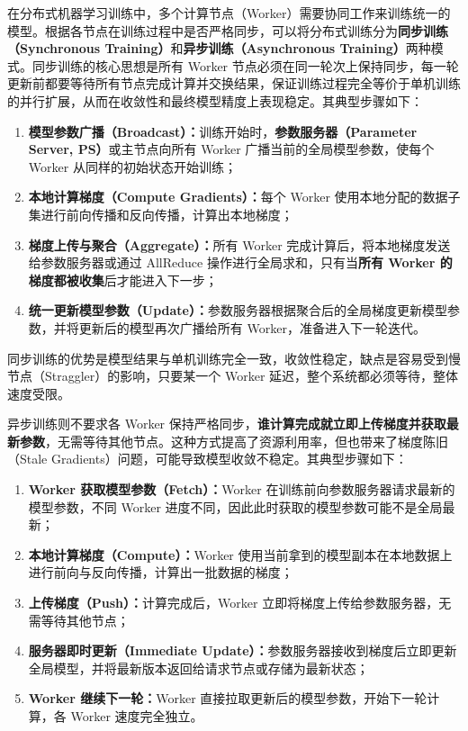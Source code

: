 \documentclass[lang=cn,newtx,10pt,scheme=chinese,chinesefont=nofont,citestyle=gb7714-2015, bibstyle=gb7714-2015]{elegantbook}
\begin{document}
\begin{refsection}
在分布式机器学习训练中，多个计算节点（Worker）需要协同工作来训练统一的模型。根据各节点在训练过程中是否严格同步，可以将分布式训练分为\textbf{同步训练（Synchronous Training）}和\textbf{异步训练（Asynchronous Training）}两种模式。同步训练的核心思想是所有 Worker 节点必须在同一轮次上保持同步，每一轮更新前都要等待所有节点完成计算并交换结果，保证训练过程完全等价于单机训练的并行扩展，从而在收敛性和最终模型精度上表现稳定。其典型步骤如下：
\begin{enumerate}
    \item \textbf{模型参数广播（Broadcast）：}训练开始时，\textbf{参数服务器（Parameter Server, PS）}或主节点向所有 Worker 广播当前的全局模型参数，使每个 Worker 从同样的初始状态开始训练；
    \item \textbf{本地计算梯度（Compute Gradients）：}每个 Worker 使用本地分配的数据子集进行前向传播和反向传播，计算出本地梯度；
    \item \textbf{梯度上传与聚合（Aggregate）：}所有 Worker 完成计算后，将本地梯度发送给参数服务器或通过 AllReduce 操作进行全局求和，只有当\textbf{所有 Worker 的梯度都被收集}后才能进入下一步；
    \item \textbf{统一更新模型参数（Update）：}参数服务器根据聚合后的全局梯度更新模型参数，并将更新后的模型再次广播给所有 Worker，准备进入下一轮迭代。
\end{enumerate}

同步训练的优势是模型结果与单机训练完全一致，收敛性稳定，缺点是容易受到慢节点（Straggler）的影响，只要某一个 Worker 延迟，整个系统都必须等待，整体速度受限。

异步训练则不要求各 Worker 保持严格同步，\textbf{谁计算完成就立即上传梯度并获取最新参数}，无需等待其他节点。这种方式提高了资源利用率，但也带来了梯度陈旧（Stale Gradients）问题，可能导致模型收敛不稳定。其典型步骤如下：
\begin{enumerate}
    \item \textbf{Worker 获取模型参数（Fetch）：}Worker 在训练前向参数服务器请求最新的模型参数，不同 Worker 进度不同，因此此时获取的模型参数可能不是全局最新；
    \item \textbf{本地计算梯度（Compute）：}Worker 使用当前拿到的模型副本在本地数据上进行前向与反向传播，计算出一批数据的梯度；
    \item \textbf{上传梯度（Push）：}计算完成后，Worker 立即将梯度上传给参数服务器，无需等待其他节点；
    \item \textbf{服务器即时更新（Immediate Update）：}参数服务器接收到梯度后立即更新全局模型，并将最新版本返回给请求节点或存储为最新状态；
    \item \textbf{Worker 继续下一轮：}Worker 直接拉取更新后的模型参数，开始下一轮计算，各 Worker 速度完全独立。
\end{enumerate}


\end{refsection}
\end{document}
